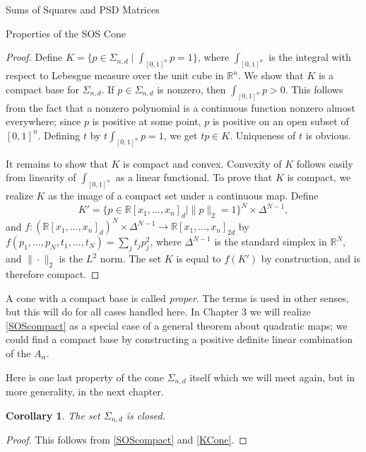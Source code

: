 \documentclass[12pt,oneside,final]{ucthesisucsbmath2010}
\newcommand{\R}{\mathbb{R}}
\newcommand{\snd}{\Sigma_{n,d}}
\newcommand{\pnd}{\R[x_1,\ldots,x_n]_{2d}}
\newcommand{\pn}{\R[x_1,\ldots,x_n]}
\newtheorem{cor}[thm]{Corollary}
\theoremstyle{definition}
\begin{document}
\begin{chapter}{Sums of Squares and PSD Matrices}
\begin{section}{Properties of the SOS Cone}
\begin{proof}Define $K = \{ p \in \snd \mid \int_{[0,1]^n}p = 1\}$, where $\int_{[0,1]^n}$ is the integral with respect to Lebesgue measure over the unit cube in $\R^n$. We show that $K$ is a compact base for $\snd$. If $p \in \snd$ is nonzero, then $\int_{[0,1]^n}p > 0$. This follows from the fact that a nonzero polynomial is a continuous function nonzero almost everywhere; since $p$ is positive at some point, $p$ is positive on an open subset of $[0,1]^n$. Defining $t$ by $t\int_{[0,1]^n}p = 1$, we get $tp \in K$. Uniqueness of $t$ is obvious.

It remains to show that $K$ is compact and convex. Convexity of $K$ follows easily from linearity of $\int_{[0,1]^n}$ as a linear functional. To prove that $K$ is compact, we realize $K$ as the image of a compact set under a continuous map. Define 
\[K' = \big\{p \in \pn_d \mid \|p\|_2 = 1\big\}^N\times \Delta^{N-1},\]
and $f: (\pn_d)^N\times \Delta^{N-1} \to \pnd$ by $f(p_1,\ldots,p_N,t_1,\ldots,t_N) = \sum_j t_jp_j^2$, where $\Delta^{N-1}$ is the standard simplex in $\R^N$, and $\|\cdot\|_2$ is the $L^2$ norm. The set $K$ is equal to $f(K')$ by construction, and is therefore compact.
\end{proof}
A cone with a compact base is called \emph{proper}. The terms is used in other senses, but this will do for all cases handled here. In Chapter $3$ we will realize \ref{SOScompact} as a special case of a general theorem about quadratic maps; we could find a compact base by constructing a positive definite linear combination of the $A_\alpha$.

Here is one last property of the cone $\snd$ itself which we will meet again, but in more generality, in the next chapter.
\begin{cor} The set $\snd$ is closed.
\label{SOSclosed}
\end{cor}
\begin{proof} This follows from \ref{SOScompact} and \ref{KCone}.
\end{proof}


\end{section}
\end{chapter}
\end{document}
